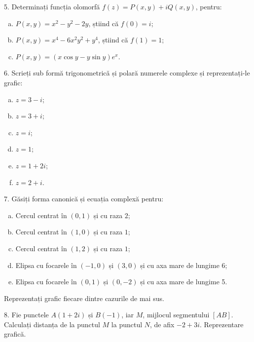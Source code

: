 \vspace{0.3cm}

5. Determinați funcția olomorfă $ f(z) = P(x, y) + iQ(x, y) $, pentru:
\begin{enumerate}[(a)]
\item $ P(x, y) = x^2 - y^2 - 2y $, știind că $ f(0) = i $;
\item $ P(x, y) = x^4 - 6x^2y^2 + y^4 $, știind că $ f(1) = 1 $;
\item $ P(x, y) = (x \cos y - y \sin y)e^x $.
\end{enumerate}

\vspace{0.3cm}

6. Scrieți sub formă trigonometrică și polară numerele complexe și
reprezentați-le grafic:
\begin{enumerate}[(a)]
\item $ z = 3 - i $;
\item $ z = 3 + i $;
\item $ z = i $;
\item $ z = 1 $;
\item $ z = 1 + 2i $;
\item $ z = 2 + i $.
\end{enumerate}

\vspace{0.3cm}

7. Găsiți forma canonică și ecuația complexă pentru:
\begin{enumerate}[(a)]
\item Cercul centrat în $ (0, 1) $ și cu raza $ 2 $;
\item Cercul centrat în $ (1, 0) $ și cu raza $ 1 $;
\item Cercul centrat în $ (1, 2) $ și cu raza $ 1 $;
\item Elipsa cu focarele în $ (-1, 0) $ și $ (3, 0) $ și cu
  axa mare de lungime 6;
\item Elipsa cu focarele în $ (0, 1) $ și $ (0, -2) $ și
  cu axa mare de lungime 5.
\end{enumerate}

Reprezentați grafic fiecare dintre cazurile de mai sus.

\vspace{0.3cm}

8. Fie punctele $ A(1 + 2i) $ și $ B(-1) $, iar $ M $, mijlocul
segmentului $ [AB] $. Calculați distanța de la punctul $ M $
la punctul $ N $, de afix $ -2 + 3i $. Reprezentare grafică.

\vspace{0.3cm}

